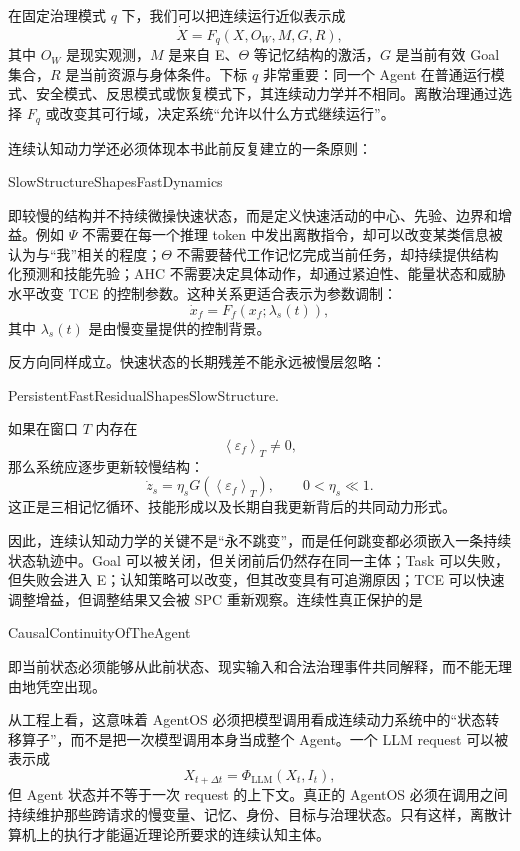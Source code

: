 在固定治理模式 \(q\) 下，我们可以把连续运行近似表示成
\[
\dot X
=
F_q
\left(
X,
O_W,
M,
G,
R
\right),
\]
其中 \(O_W\) 是现实观测，\(M\) 是来自 E、\(\Theta\) 等记忆结构的激活，\(G\) 是当前有效 Goal 集合，\(R\) 是当前资源与身体条件。下标 \(q\) 非常重要：同一个 Agent 在普通运行模式、安全模式、反思模式或恢复模式下，其连续动力学并不相同。离散治理通过选择 \(F_q\) 或改变其可行域，决定系统“允许以什么方式继续运行”。

连续认知动力学还必须体现本书此前反复建立的一条原则：
\begin{statementbox}
SlowStructureShapesFastDynamics
\end{statementbox}
即较慢的结构并不持续微操快速状态，而是定义快速活动的中心、先验、边界和增益。例如 \(\Psi\) 不需要在每一个推理 token 中发出离散指令，却可以改变某类信息被认为与“我”相关的程度；\(\Theta\) 不需要替代工作记忆完成当前任务，却持续提供结构化预测和技能先验；AHC 不需要决定具体动作，却通过紧迫性、能量状态和威胁水平改变 TCE 的控制参数。这种关系更适合表示为参数调制：
\[
\dot x_f
=
F_f
\left(
x_f;
\lambda_s(t)
\right),
\]
其中 \(\lambda_s(t)\) 是由慢变量提供的控制背景。

反方向同样成立。快速状态的长期残差不能永远被慢层忽略：
\begin{statementbox}
PersistentFastResidualShapesSlowStructure.
\end{statementbox}
如果在窗口 \(T\) 内存在
\[
\left\langle
\varepsilon_f
\right\rangle_T
\neq 0,
\]
那么系统应逐步更新较慢结构：
\[
\dot z_s
=
\eta_s
G
\left(
\left\langle
\varepsilon_f
\right\rangle_T
\right),
\qquad
0<\eta_s\ll 1.
\]
这正是三相记忆循环、技能形成以及长期自我更新背后的共同动力形式。

因此，连续认知动力学的关键不是“永不跳变”，而是任何跳变都必须嵌入一条持续状态轨迹中。Goal 可以被关闭，但关闭前后仍然存在同一主体；Task 可以失败，但失败会进入 E；认知策略可以改变，但其改变具有可追溯原因；TCE 可以快速调整增益，但调整结果又会被 SPC 重新观察。连续性真正保护的是
\begin{statementbox}
CausalContinuityOfTheAgent
\end{statementbox}
即当前状态必须能够从此前状态、现实输入和合法治理事件共同解释，而不能无理由地凭空出现。

从工程上看，这意味着 AgentOS 必须把模型调用看成连续动力系统中的“状态转移算子”，而不是把一次模型调用本身当成整个 Agent。一个 LLM request 可以被表示成
\[
X_{t+\Delta t}
=
\Phi_{\mathrm{LLM}}
\left(
X_t,
I_t
\right),
\]
但 Agent 状态并不等于一次 request 的上下文。真正的 AgentOS 必须在调用之间持续维护那些跨请求的慢变量、记忆、身份、目标与治理状态。只有这样，离散计算机上的执行才能逼近理论所要求的连续认知主体。

